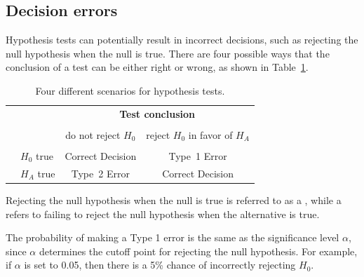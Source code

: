 \begin{spacing}{1.5}


\subsection{Decision errors}

Hypothesis tests can potentially result in incorrect decisions, such as rejecting the null hypothesis when the null is true. There are four possible ways that the conclusion of a test can be either right or wrong, as shown in Table~\ref{fourHTScenarios}. 

\begin{table}[ht]
	\centering
	\begin{tabular}{l l c c}
		& & \multicolumn{2}{c}{\textbf{Test conclusion}} \\
		\cline{3-4}
		\vspace{-3.7mm} \\
		& & do not reject $H_0$ &  reject $H_0$ in favor of $H_A$ \\
		\cline{2-4}
		\vspace{-3.7mm} \\
		& $H_0$ true & Correct Decision &  Type~1 Error \\
		\raisebox{1.5ex}{\textbf{Truth}} & $H_A$ true & Type~2 Error & Correct Decision\\
		\cline{2-4}
	\end{tabular}
	\caption{Four different scenarios for hypothesis tests.}
	\label{fourHTScenarios}
\end{table}

Rejecting the null hypothesis when the null is true is referred to as a , while a  refers to failing to reject the null hypothesis when the alternative is true. 

The probability of making a Type 1 error is the same as the significance level $\alpha$, since $\alpha$ determines the cutoff point for rejecting the null hypothesis. For example, if $\alpha$ is set to 0.05, then there is a 5\% chance of incorrectly rejecting $H_0$. 


\end{spacing}
